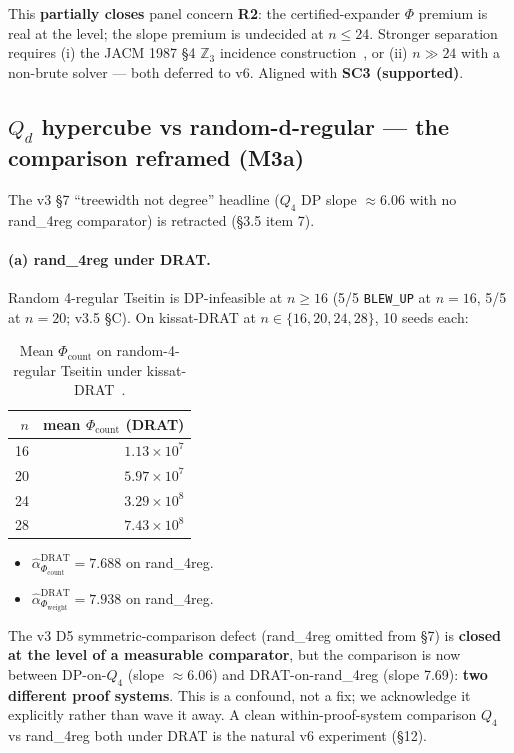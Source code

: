 \documentclass[11pt,a4paper]{article}
\theoremstyle{remark}
\begin{document}
This \textbf{partially closes} panel concern \textbf{R2}: the
certified-expander $\Phi$ premium is real at the level; the slope premium
is undecided at $n \le 24$. Stronger separation requires (i) the JACM
1987 \S4 $\mathbb{Z}_3$ incidence construction~\cite{Urquhart1987}, or
(ii) $n \gg 24$ with a non-brute solver --- both deferred to v6. Aligned
with \textbf{SC3 (supported)}.

\subsection{$Q_d$ hypercube vs random-d-regular --- the comparison reframed (M3a)}

The v3 \S7 ``treewidth not degree'' headline ($Q_4$ DP slope $\approx
6.06$ with no rand\_4reg comparator) is retracted (\S3.5 item 7).

\paragraph{(a) rand\_4reg under DRAT.} Random 4-regular Tseitin is
DP-infeasible at $n \ge 16$ (5/5 \texttt{BLEW\_UP} at $n=16$, 5/5 at
$n=20$; v3.5 \S C). On kissat-DRAT at $n \in \{16, 20, 24, 28\}$, 10
seeds each:

\begin{table}[H]
\centering
\small
\begin{tabular}{@{}rr@{}}
\toprule
$n$ & mean $\Phi_{\mathrm{count}}$ (DRAT) \\
\midrule
16 & $1.13{\times}10^7$ \\
20 & $5.97{\times}10^7$ \\
24 & $3.29{\times}10^8$ \\
28 & $7.43{\times}10^8$ \\
\bottomrule
\end{tabular}
\caption{Mean $\Phi_{\mathrm{count}}$ on random-4-regular Tseitin under kissat-DRAT~\cite{kissat,WHH2014}.}
\label{tab:rand4reg}
\end{table}

\begin{itemize}
\item $\widehat\alpha_{\Phi_{\mathrm{count}}}^{\mathrm{DRAT}} = 7.688$ on
rand\_4reg.
\item $\widehat\alpha_{\Phi_{\mathrm{weight}}}^{\mathrm{DRAT}} = 7.938$ on
rand\_4reg.
\end{itemize}

The v3 D5 symmetric-comparison defect (rand\_4reg omitted from \S7) is
\textbf{closed at the level of a measurable comparator}, but the
comparison is now between DP-on-$Q_4$ (slope $\approx 6.06$) and
DRAT-on-rand\_4reg (slope 7.69): \textbf{two different proof systems}.
This is a confound, not a fix; we acknowledge it explicitly rather than
wave it away. A clean within-proof-system comparison $Q_4$ vs rand\_4reg
both under DRAT is the natural v6 experiment (\S12).
\end{document}

